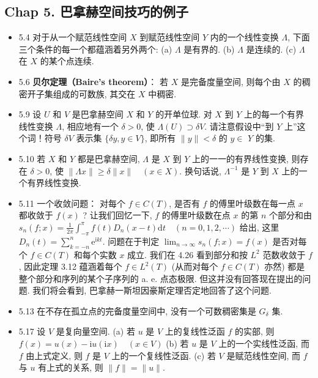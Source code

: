 \subsection{Chap 5. 巴拿赫空间技巧的例子}

\begin{itemize}
\item 5.4 对于从一个赋范线性空间 $X$ 到赋范线性空间 $Y$ 内的一个线性变换 $\Lambda$, 下面三个条件的每一个都蕴涵着另外两个: (a) $\Lambda$ 是有界的. (b) $\Lambda$ 是连续的. (c) $\Lambda$ 在 $X$ 的某个点连续.

\item 5.6 \textbf{贝尔定理（Baire's theorem）}： 若 $X$ 是完备度量空间, 则每个由 $X$ 的稠密开子集组成的可数族, 其交在 $X$ 中稠密.

\item 5.9 设 $U$ 和 $V$ 是巴拿赫空间 $X$ 和 $Y$ 的开单位球. 对 $X$ 到 $Y$ 上的每一个有界线性变换 $\Lambda$, 相应地有一个 $\delta>0$, 使 $\Lambda(U) \supset \delta V$. 请注意假设中“到 $Y$ 上”这个词！符号 $\delta V$ 表示集 $\{\delta y, y \in V\}$, 即所有 $\|y\|<\delta$ 的 $y \in$ $Y$ 的集.

\item 5.10 若 $X$ 和 $Y$ 都是巴拿赫空间, $\Lambda$ 是 $X$ 到 $Y$ 上的一一的有界线性变换, 则存在 $\delta>0$, 使 $\|\Lambda x\| \geqslant \delta\|x\| \quad(x \in X)$. 换句话说, $\Lambda^{-1}$ 是 $Y$ 到 $X$ 上的一个有界线性变换.

\item 5.11 一个收敛问题： 对每个 $f \in C(T)$, 是否有 $f$ 的傅里叶级数在每一点 $x$ 都收敛于 $f(x)$ ? 让我们回忆一下, $f$ 的傅里叶级数在点 $x$ 的第 $n$ 个部分和由 $s_{n}(f ; x)=\frac{1}{2 \pi} \int_{-\pi}^{\pi} f(t) D_{n}(x-t) \mathrm{d} t \quad(n=0,1,2, \cdots)$ 给出, 这里 $D_{n}(t)=\sum_{k=-n}^{n} \mathrm{e}^{\mathrm{i} k t}$. 问题在于判定 $\lim _{n \rightarrow \infty} s_{n}(f ; x)=f(x)$ 是否对每个 $f \in C(T)$ 和每个实数 $x$ 成立. 我们在 4.26 看到部分和按 $L^{2}$ 范数收敛于 $f$, 因此定理 3.12 蕴涵着每个 $f \in L^{2}(T)$ (从而对每个 $f \in C(T)$ 亦然) 都是整个部分和序列的某个子序列的 a. e. 点态极限. 但这并没有回答现在提出的问题. 我们将会看到, 巴拿赫一斯坦因豪斯定理否定地回答了这个问题.

\item 5.13 在不存在孤立点的完备度量空间中, 没有一个可数稠密集是 $G_{\delta}$ 集.

\item 5.17 设 $V$ 是复向量空间. (a) 若 $u$ 是 $V$ 上的复线性泛函 $f$ 的实部, 则 $f(x)=u(x)-\mathrm{i} u(\mathrm{i} x) \quad(x \in V)$ (b) 若 $u$ 是 $V$ 上的一个实线性泛函, 而 $f$ 由上式定义, 则 $f$ 是 $V$ 上的一个复线性泛函. (c) 若 $V$ 是赋范线性空间, 而 $f$ 与 $u$ 有上式的关系, 则 $\|f\|=\|u\|$.


\end{itemize}

